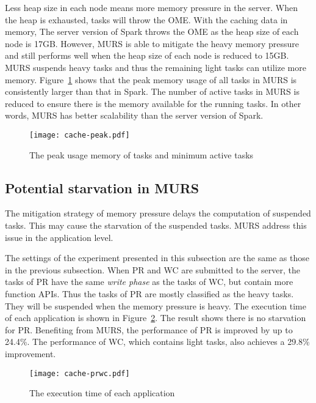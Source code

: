 Less heap size in each node means more memory pressure in the server. When the heap is exhausted, tasks will throw the OME. With the caching data in memory, The server version of Spark throws the OME as the heap size of each node is 17GB. However, MURS is able to mitigate the heavy memory pressure and still performs well when the heap size of each node is reduced to 15GB. MURS suspends heavy tasks and  thus the remaining light tasks can utilize more memory. Figure~\ref{fig:cache-peak} shows that the peak memory usage of all tasks in MURS is consistently larger than that in Spark. The number of active tasks in MURS is reduced to ensure there is the memory available for the running tasks. In other words, MURS has better scalability than the server version of Spark.

\begin{figure}[!t]
\centering
\texttt{[image: cache-peak.pdf]}
\vspace{-2mm}
\caption{The peak usage memory of tasks and minimum active tasks}
\vspace{-4mm}
\label{fig:cache-peak}
\end{figure}

\subsection{Potential starvation in MURS}

The mitigation strategy of memory pressure delays the computation of suspended tasks. This may cause the starvation of the suspended tasks. MURS address this issue in the application level.

The settings of the experiment presented in this subsection are the same as those in the previous subsection. When PR and WC are submitted to the server, the tasks of PR have the same \textit{write phase} as the tasks of WC, but contain more function APIs. Thus the tasks of PR are mostly classified as the heavy tasks. They will be suspended when the memory pressure is heavy. The execution time of each application is shown in Figure~\ref{fig:cache-prwc}. The result shows there is no starvation for PR. Benefiting from MURS, the performance of PR is improved by up to 24.4\%. The performance of WC, which contains light tasks, also achieves a 29.8\% improvement. 

\begin{figure}[!t]
\centering
\texttt{[image: cache-prwc.pdf]}
\vspace{-2mm}
\caption{The execution time of each application}
\vspace{-4mm}
\label{fig:cache-prwc}
\end{figure}

